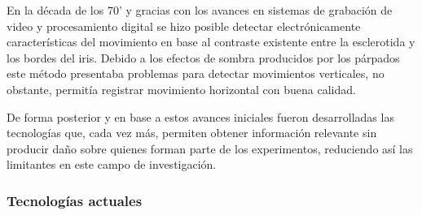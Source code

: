 \documentclass[../main.tex]{subfiles}
\begin{document}
			En la década de los 70' y gracias con los avances en sistemas de grabación de video y procesamiento digital se hizo posible detectar electrónicamente características del movimiento en base al contraste existente entre la \gls{esclerotida} y los bordes del iris. Debido a los efectos de sombra producidos por los párpados este método presentaba problemas para detectar movimientos verticales, no obstante, permitía registrar movimiento horizontal con buena calidad. 

			De forma posterior y en base a estos avances iniciales fueron desarrolladas las tecnologías que, cada vez más, permiten obtener información relevante sin producir daño sobre quienes forman parte de los experimentos, reduciendo así las limitantes en este campo de investigación.    

			\subsubsection{Tecnologías actuales}
			\label{ssub:02_tecnologias_actuales}
\end{document}
